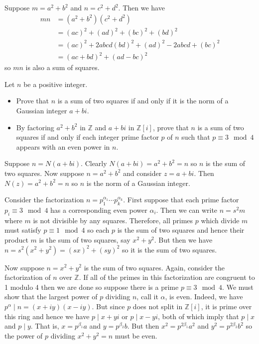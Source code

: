 \documentclass[../../master.tex]{subfiles}
\begin{document}
\begin{solution}
    Suppose $m = a^2 + b^2$ and $n = c^2 + d^2$.
    Then we have
    \begin{align*}
        mn &= (a^2 + b^2) (c^2 + d^2) \\
           &= (ac)^2 + (ad)^2 + (bc)^2 + (bd)^2 \\
           &= (ac)^2 + 2abcd (bd)^2 + (ad)^2 - 2abcd + (bc)^2 \\
           &= (ac + bd)^2 + (ad - bc)^2
    \end{align*}
    so $mn$ is also a sum of squares.
\end{solution}

\begin{problem}
    Let $n$ be a positive integer.
    \begin{itemize}
        \item Prove that $n$ is a sum of two squares if and only if it is the norm of a Gaussian integer $a + bi$.
        \item By factoring $a^2 + b^2$ in $\mathbb{Z}$ and $a + bi$ in $\mathbb{Z}[i]$, prove that $n$ is a sum of two squares if and only if each integer prime factor $p$ of $n$ such that $p \equiv 3 \mod 4$ appears with an even power in $n$.
    \end{itemize}
\end{problem}

\begin{solution}
    Suppose $n = N(a + bi)$.
    Clearly $N(a + bi) = a^2 + b^2 = n$ so $n$ is the sum of two squares.
    Now suppose $n = a^2 + b^2$ and consider $z = a + bi$.
    Then $N(z) = a^2 + b^2 = n$ so $n$ is the norm of a Gaussian integer.

    Consider the factorization $n = p_1^{\alpha_1} \cdots p_k^{\alpha_k}$.
    First suppose that each prime factor $p_i \equiv 3 \mod 4$ has a corresponding even power $\alpha_i$.
    Then we can write $n = s^2 m$ where $m$ is not divisible by any squares.
    Therefore, all primes $p$ which divide $m$ must satisfy $p \equiv 1 \mod 4$ so each $p$ is the sum of two squares and hence their product $m$ is the sum of two squares, say $x^2 + y^2$.
    But then we have $n = s^2 (x^2 + y^2) = (sx)^2 + (sy)^2$ so it is the sum of two squares.

    Now suppose $n = x^2 + y^2$ is the sum of two squares.
    Again, consider the factorization of $n$ over $\mathbb{Z}$.
    If all of the primes in this factorization are congruent to 1 modulo 4 then we are done so suppose there is a prime $p \equiv 3 \mod 4$.
    We must show that the largest power of $p$ dividing $n$, call it $\alpha$, is even.
    Indeed, we have $p^{\alpha} \mid n = (x + iy) (x - iy)$.
    But since $p$ does not split in $\mathbb{Z}[i]$, it is prime over this ring and hence we have $p \mid x + yi$ or $p \mid x - yi$, both of which imply that $p \mid x$ and $p \mid y$.
    That is, $x = p^{\beta_1} a$ and $y = p^{\beta_2} b$.
    But then $x^2 = p^{2\beta_1} a^2$ and $y^2 = p^{2 \beta_2} b^2$ so the power of $p$ dividing $x^2 + y^2 = n$ must be even.
\end{solution}
\end{document}
